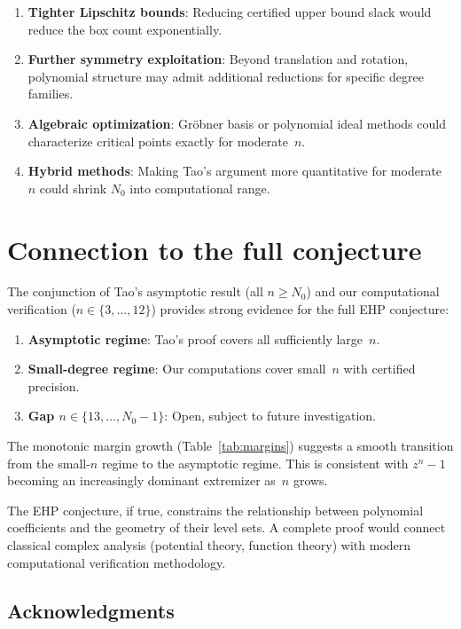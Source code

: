 \documentclass[11pt]{article}
\theoremstyle{plain}
\theoremstyle{definition}
\theoremstyle{remark}
\begin{document}
\begin{enumerate}[nosep]
\item \textbf{Tighter Lipschitz bounds}: Reducing certified upper bound slack would reduce the box count exponentially.
\item \textbf{Further symmetry exploitation}: Beyond translation and rotation, polynomial structure may admit additional reductions for specific degree families.
\item \textbf{Algebraic optimization}: Gr\"obner basis or polynomial ideal methods could characterize critical points exactly for moderate~$n$.
\item \textbf{Hybrid methods}: Making Tao's argument more quantitative for moderate~$n$ could shrink $N_0$ into computational range.
\end{enumerate}

\section{Connection to the full conjecture}

The conjunction of Tao's asymptotic result (all $n \geq N_0$) and our computational verification ($n \in \{3, \ldots, 12\}$) provides strong evidence for the full EHP conjecture:

\begin{enumerate}[nosep]
\item \textbf{Asymptotic regime}: Tao's proof covers all sufficiently large~$n$.
\item \textbf{Small-degree regime}: Our computations cover small~$n$ with certified precision.
\item \textbf{Gap $n \in \{13, \ldots, N_0 - 1\}$}: Open, subject to future investigation.
\end{enumerate}

The monotonic margin growth (Table~\ref{tab:margins}) suggests a smooth transition from the small-$n$ regime to the asymptotic regime. This is consistent with $z^n - 1$ becoming an increasingly dominant extremizer as~$n$ grows.

The EHP conjecture, if true, constrains the relationship between polynomial coefficients and the geometry of their level sets. A complete proof would connect classical complex analysis (potential theory, function theory) with modern computational verification methodology.

\subsection*{Acknowledgments}
\end{document}
